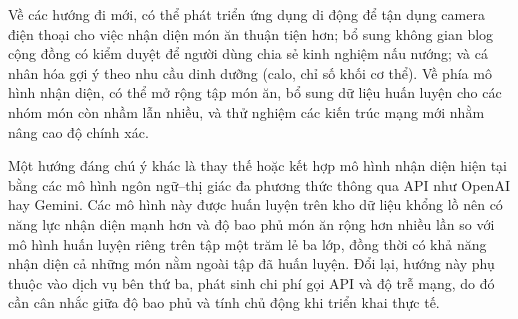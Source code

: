 \documentclass[../DoAn.tex]{subfiles}
\begin{document}
Về các hướng đi mới, có thể phát triển ứng dụng di động để tận dụng camera điện thoại cho việc nhận diện món ăn thuận tiện hơn; bổ sung không gian blog cộng đồng có kiểm duyệt để người dùng chia sẻ kinh nghiệm nấu nướng; và cá nhân hóa gợi ý theo nhu cầu dinh dưỡng (calo, chỉ số khối cơ thể). Về phía mô hình nhận diện, có thể mở rộng tập món ăn, bổ sung dữ liệu huấn luyện cho các nhóm món còn nhầm lẫn nhiều, và thử nghiệm các kiến trúc mạng mới nhằm nâng cao độ chính xác.

Một hướng đáng chú ý khác là thay thế hoặc kết hợp mô hình nhận diện hiện tại bằng các mô hình ngôn ngữ--thị giác đa phương thức thông qua API như OpenAI hay Gemini. Các mô hình này được huấn luyện trên kho dữ liệu khổng lồ nên có năng lực nhận diện mạnh hơn và độ bao phủ món ăn rộng hơn nhiều lần so với mô hình huấn luyện riêng trên tập một trăm lẻ ba lớp, đồng thời có khả năng nhận diện cả những món nằm ngoài tập đã huấn luyện. Đổi lại, hướng này phụ thuộc vào dịch vụ bên thứ ba, phát sinh chi phí gọi API và độ trễ mạng, do đó cần cân nhắc giữa độ bao phủ và tính chủ động khi triển khai thực tế.
\end{document}
